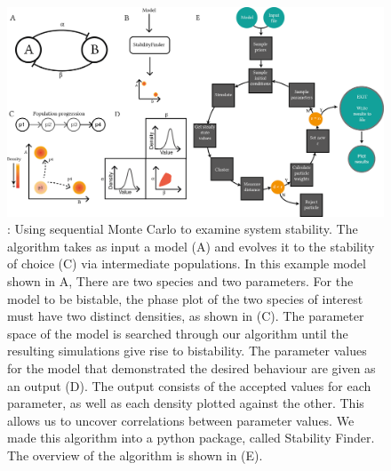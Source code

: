 \begin{figure}[h]
\begin{center}
\includegraphics[scale=0.9]{../../chapters/chapterStabilityFinder/images/SF_algo_overv.png}
\caption[LoF caption]{\label{fig:fig1}: Using sequential Monte Carlo to examine system stability. The algorithm takes as input a model (A) and evolves it to the stability of choice (C) via intermediate populations. In this example model shown in A, There are two species and two parameters. For the model to be bistable, the phase plot of the two species of interest must have two distinct densities, as shown in (C). The parameter space of the model is searched through our algorithm until the resulting simulations give rise to bistability. The parameter values for the model that demonstrated the desired behaviour are given as an output (D). The output consists of the accepted values for each parameter, as well as each density plotted against the other. This allows us to uncover correlations between parameter values. We made this algorithm into a python package, called Stability Finder. The overview of the algorithm is shown in (E).}
\end{center}
\end{figure}
\clearpage



